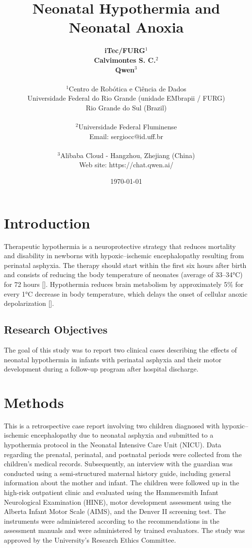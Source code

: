 \documentclass[11pt,a4paper]{article}
\title{\textbf{Neonatal Hypothermia and Neonatal Anoxia}}
\author{
	\textbf{iTec/FURG}$^{1}$ \\
	\textbf{Calvimontes S. C.}$^{2}$ \\
	\textbf{Qwen}$^{3}$ \\
	\\
	\small $^{1}$Centro de Robótica e Ciência de Dados \\
	\small Universidade Federal do Rio Grande (unidade EMbrapii / FURG) \\
	\small Rio Grande do Sul (Brazil) \\
	\\
	\small $^{2}$Universidade Federal Fluminense \\
	\small Email: sergiocc@id.uff.br \\
	\\
	\small $^{3}$Alibaba Cloud - Hangzhou, Zhejiang (China) \\
	\small Web site: https://chat.qwen.ai/
}
\date{\today}
\begin{document}
	
	\maketitle
	
	\newpage
	
	\section{Introduction}
	Therapeutic hypothermia is a neuroprotective strategy that reduces mortality and disability in newborns with hypoxic–ischemic encephalopathy resulting from perinatal asphyxia. The therapy should start within the first six hours after birth and consists of reducing the body temperature of neonates (average of 33–34°C) for 72 hours [\cite{Azzopardi2014,Laptook2017,Thayyil2021}]. Hypothermia reduces brain metabolism by approximately 5\% for every 1°C decrease in body temperature, which delays the onset of cellular anoxic depolarization [\cite{Silveira2015}].
		
	\subsection{Research Objectives}
	The goal of this study was to report two clinical cases describing the effects of neonatal hypothermia in infants with perinatal asphyxia and their motor development during a follow-up program after hospital discharge.
	
	\section{Methods}
	This is a retrospective case report involving two children diagnosed with hypoxic–ischemic encephalopathy due to neonatal asphyxia and submitted to a hypothermia protocol in the Neonatal Intensive Care Unit (NICU). Data regarding the prenatal, perinatal, and postnatal periods were collected from the children's medical records. Subsequently, an interview with the guardian was conducted using a semi-structured maternal history guide, including general information about the mother and infant. The children were followed up in the high-risk outpatient clinic and evaluated using the Hammersmith Infant Neurological Examination (HINE), motor development assessment using the Alberta Infant Motor Scale (AIMS), and the Denver II screening test. The instruments were administered according to the recommendations in the assessment manuals and were administered by trained evaluators. The study was approved by the University's Research Ethics Committee.
	
\end{document}
